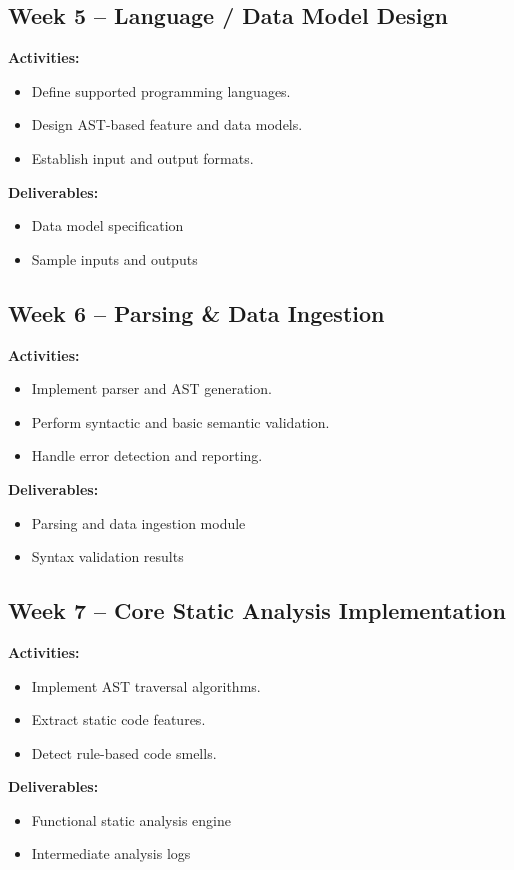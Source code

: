 \documentclass[12pt,a4paper]{article}
\begin{document}
\subsection*{Week 5 -- Language / Data Model Design}
\textbf{Activities:}
\begin{itemize}[noitemsep]
    \item Define supported programming languages.
    \item Design AST-based feature and data models.
    \item Establish input and output formats.
\end{itemize}
\textbf{Deliverables:}
\begin{itemize}[noitemsep]
    \item Data model specification
    \item Sample inputs and outputs
\end{itemize}

\subsection*{Week 6 -- Parsing \& Data Ingestion}
\textbf{Activities:}
\begin{itemize}[noitemsep]
    \item Implement parser and AST generation.
    \item Perform syntactic and basic semantic validation.
    \item Handle error detection and reporting.
\end{itemize}
\textbf{Deliverables:}
\begin{itemize}[noitemsep]
    \item Parsing and data ingestion module
    \item Syntax validation results
\end{itemize}

\subsection*{Week 7 -- Core Static Analysis Implementation}
\textbf{Activities:}
\begin{itemize}[noitemsep]
    \item Implement AST traversal algorithms.
    \item Extract static code features.
    \item Detect rule-based code smells.
\end{itemize}
\textbf{Deliverables:}
\begin{itemize}[noitemsep]
    \item Functional static analysis engine
    \item Intermediate analysis logs
\end{itemize}
\end{document}
